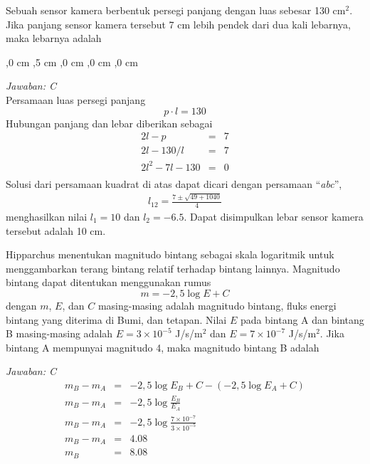 \documentclass[11pt,fleqn, a4paper]{exam}
\begin{document}
\begin{questions}
\vspace{0.5cm}
\question Sebuah sensor kamera berbentuk persegi panjang dengan luas sebesar 130 cm$^{2}$. Jika panjang sensor kamera tersebut 7 cm lebih pendek dari dua kali lebarnya, maka lebarnya adalah
\begin{choices}
,0 cm
,5 cm
,0 cm
,0 cm
,0 cm
\end{choices}

\textit{Jawaban: C}\\
Persamaan luas persegi panjang
\begin{equation*}
p \cdot l = 130
\end{equation*}
Hubungan panjang dan lebar diberikan sebagai
\begin{eqnarray*}
2l - p &=& 7\\
2l - 130/l &=& 7\\
2l^{2} - 7l - 130 &=& 0\\
\end{eqnarray*}
Solusi dari persamaan kuadrat di atas dapat dicari dengan persamaan ``\textit{abc}'',
\begin{eqnarray*}
l_{12} = \frac{7 \pm \sqrt{49 + 1040}}{4}
\end{eqnarray*}
menghasilkan nilai $l_1 = 10$ dan $l_2 = -6.5$. Dapat disimpulkan lebar sensor kamera tersebut adalah 10 cm.


\vspace{0.5cm}
\question Hipparchus menentukan magnitudo bintang sebagai skala logaritmik untuk menggambarkan terang bintang relatif terhadap bintang lainnya. Magnitudo bintang dapat ditentukan menggunakan rumus
\begin{equation*}
m = -2,5 \log{E} + C
\end{equation*}
dengan $m$, $E$, dan $C$ masing-masing adalah magnitudo bintang, fluks energi bintang yang diterima di Bumi, dan tetapan. Nilai $E$ pada bintang A dan bintang B masing-masing adalah $E = 3 \times 10^{-5}$ J/s/m$^2$ dan $E = 7 \times 10^{-7}$ J/s/m$^2$. Jika bintang A mempunyai magnitudo 4, maka magnitudo bintang B adalah  

\begin{choices}
\end{choices}

\textit{Jawaban: C}
\begin{eqnarray*}
m_B-m_A&=&-2,5\log E_B+C - (-2,5\log E_A+C)\\
m_B-m_A&=&-2,5\log \frac{E_B}{E_A} \\
m_B-m_A&=&-2,5\log \frac{7 \times 10^{-7}}{3 \times 10^{-5}} \\
m_B-m_A&=&4.08\\
m_B&=&8.08\\
\end{eqnarray*}
 


\end{questions}
\end{document}
